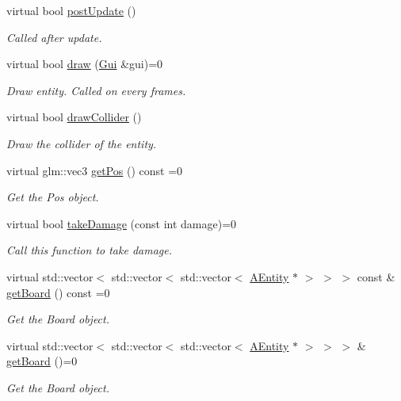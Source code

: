 \begin{DoxyCompactItemize}
virtual bool \hyperlink{class_a_entity_ae2faa1d11e21033a223fef2bc03b9338}{post\+Update} ()
\begin{DoxyCompactList}\small\item\em Called after update. \end{DoxyCompactList}\item 
virtual bool \hyperlink{class_a_entity_ad9404a7cae108eb81d881d256cacdc12}{draw} (\hyperlink{class_gui}{Gui} \&gui)=0
\begin{DoxyCompactList}\small\item\em Draw entity. Called on every frames. \end{DoxyCompactList}\item 
virtual bool \hyperlink{class_a_entity_aca789d9c82a5fd3da3b196a36e748e8b}{draw\+Collider} ()
\begin{DoxyCompactList}\small\item\em Draw the collider of the entity. \end{DoxyCompactList}\item 
virtual glm\+::vec3 \hyperlink{class_a_entity_afbdb591f06debd7e20e0cb98f14717e4}{get\+Pos} () const =0
\begin{DoxyCompactList}\small\item\em Get the Pos object. \end{DoxyCompactList}\item 
virtual bool \hyperlink{class_a_entity_ac01e24195a8ba249c855120ac017770e}{take\+Damage} (const int damage)=0
\begin{DoxyCompactList}\small\item\em Call this function to take damage. \end{DoxyCompactList}\item 
virtual std\+::vector$<$ std\+::vector$<$ std\+::vector$<$ \hyperlink{class_a_entity}{A\+Entity} $\ast$ $>$ $>$ $>$ const  \& \hyperlink{class_a_entity_a9ed84c8f926cf6032be480ebba7d1820}{get\+Board} () const =0
\begin{DoxyCompactList}\small\item\em Get the Board object. \end{DoxyCompactList}\item 
virtual std\+::vector$<$ std\+::vector$<$ std\+::vector$<$ \hyperlink{class_a_entity}{A\+Entity} $\ast$ $>$ $>$ $>$ \& \hyperlink{class_a_entity_a44aa82958386de50cd9a6c836461114a}{get\+Board} ()=0
\begin{DoxyCompactList}\small\item\em Get the Board object. \end{DoxyCompactList}\item 

\end{DoxyCompactItemize}
